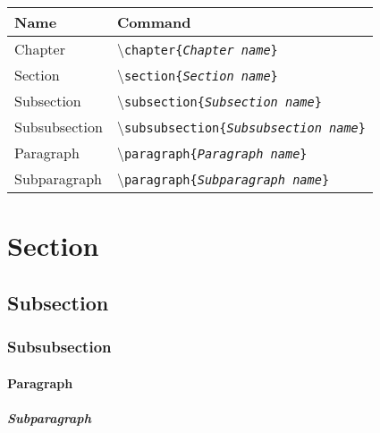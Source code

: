 \begin{table}[H]
\centering
\begin{tabular}{ll} \hline\hline
Name & Command\\ \hline
Chapter & \textbackslash\texttt{chapter\{\emph{Chapter name}\}}\\
Section & \textbackslash\texttt{section\{\emph{Section name}\}}\\
Subsection & \textbackslash\texttt{subsection\{\emph{Subsection name}\}}\\
Subsubsection & \textbackslash\texttt{subsubsection\{\emph{Subsubsection name}\}}\\
Paragraph & \textbackslash\texttt{paragraph\{\emph{Paragraph name}\}}\\
Subparagraph & \textbackslash\texttt{paragraph\{\emph{Subparagraph name}\}}\\ \hline\hline
\end{tabular}
\end{table}

\section{Section} \label{Section_ref}
\subsection{Subsection}
\subsubsection{Subsubsection}
\paragraph{Paragraph}
\subparagraph{Subparagraph}

